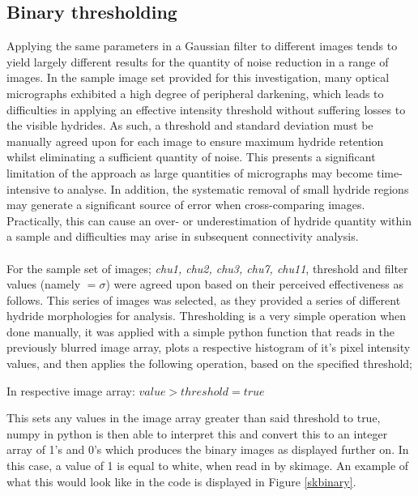 \documentclass{article}
\begin{document}
	\subsection{Binary thresholding}
	Applying the same parameters in a Gaussian filter to different images tends to yield largely different results for the quantity of noise reduction in a range of images. In the sample image set provided for this investigation, many optical micrographs exhibited a high degree of peripheral darkening, which leads to difficulties in applying an effective intensity threshold without suffering losses to the visible hydrides. As such, a threshold and standard deviation must be manually agreed upon for each image to ensure maximum hydride retention whilst eliminating a sufficient quantity of noise. This presents a significant limitation of the approach as large quantities of micrographs may become time-intensive to analyse. In addition, the systematic removal of small hydride regions may generate a significant source of error when cross-comparing images. Practically, this can cause an over- or underestimation of hydride quantity within a sample and difficulties may arise in subsequent connectivity analysis.
	\\ 
	\\
	For the sample set of images; \textit{chu1, chu2, chu3, chu7, chu11}, threshold and filter values (namely $=\sigma$) were agreed upon based on their perceived effectiveness as follows. This series of images was selected, as they provided a series of different hydride morphologies for analysis. Thresholding is a very simple operation when done manually, it was applied with a simple python function that reads in the previously blurred image array, plots a respective histogram of it's pixel intensity values, and then applies the following operation, based on the specified threshold;
	\begin{center}
		In respective image array: $ value > threshold = true $
	\end{center}
	This sets any values in the image array greater than said threshold to true, numpy in python is then able to interpret this and convert this to an integer array of 1's and 0's which produces the binary images as displayed further on. In this case, a value of 1 is equal to white, when read in by skimage. An example of what this would look like in the code is displayed in Figure \ref{skbinary}.
	
\end{document}
